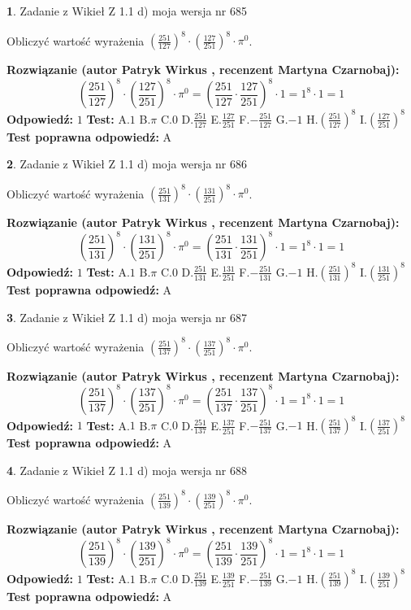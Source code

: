 \documentclass[12pt, a4paper]{article}
\theoremstyle{definition} %
\newtheorem{zad}{}
\newcommand{\zadStart}[1]{\begin{zad}#1\newline}
\newcommand{\zadStop}{\end{zad}}
\newcommand{\rozwStart}[2]{\noindent \textbf{Rozwiązanie (autor #1 , recenzent #2): }\newline}
\newcommand{\rozwStop}{\newline}
\newcommand{\odpStart}{\noindent \textbf{Odpowiedź:}\newline}
\newcommand{\odpStop}{\newline}
\newcommand{\testStart}{\noindent \textbf{Test:}\newline}
\newcommand{\testStop}{\newline}
\newcommand{\kluczStart}{\noindent \textbf{Test poprawna odpowiedź:}\newline}
\newcommand{\kluczStop}{\newline}
\begin{document}
\zadStart{Zadanie z Wikieł Z 1.1 d) moja wersja nr 685}

Obliczyć wartość wyrażenia $(\frac{251}{127})^{8} \cdot (\frac{127}{251})^{8} \cdot \pi^{0}$.
\zadStop
\rozwStart{Patryk Wirkus}{Martyna Czarnobaj}
$$(\frac{251}{127})^{8} \cdot (\frac{127}{251})^{8} \cdot \pi^{0} = (\frac{251}{127} \cdot \frac{127}{251})^{8} \cdot 1 = 1^{8} \cdot 1 = 1$$
\rozwStop
\odpStart
$1$
\odpStop
\testStart
A.$1$ B.$\pi$ C.$0$ D.$\frac{251}{127}$ E.$\frac{127}{251}$
F.$-\frac{251}{127}$ G.$-1$
H.$(\frac{251}{127})^{8}$
I.$(\frac{127}{251})^{8}$
\testStop
\kluczStart
A
\kluczStop



\zadStart{Zadanie z Wikieł Z 1.1 d) moja wersja nr 686}

Obliczyć wartość wyrażenia $(\frac{251}{131})^{8} \cdot (\frac{131}{251})^{8} \cdot \pi^{0}$.
\zadStop
\rozwStart{Patryk Wirkus}{Martyna Czarnobaj}
$$(\frac{251}{131})^{8} \cdot (\frac{131}{251})^{8} \cdot \pi^{0} = (\frac{251}{131} \cdot \frac{131}{251})^{8} \cdot 1 = 1^{8} \cdot 1 = 1$$
\rozwStop
\odpStart
$1$
\odpStop
\testStart
A.$1$ B.$\pi$ C.$0$ D.$\frac{251}{131}$ E.$\frac{131}{251}$
F.$-\frac{251}{131}$ G.$-1$
H.$(\frac{251}{131})^{8}$
I.$(\frac{131}{251})^{8}$
\testStop
\kluczStart
A
\kluczStop



\zadStart{Zadanie z Wikieł Z 1.1 d) moja wersja nr 687}

Obliczyć wartość wyrażenia $(\frac{251}{137})^{8} \cdot (\frac{137}{251})^{8} \cdot \pi^{0}$.
\zadStop
\rozwStart{Patryk Wirkus}{Martyna Czarnobaj}
$$(\frac{251}{137})^{8} \cdot (\frac{137}{251})^{8} \cdot \pi^{0} = (\frac{251}{137} \cdot \frac{137}{251})^{8} \cdot 1 = 1^{8} \cdot 1 = 1$$
\rozwStop
\odpStart
$1$
\odpStop
\testStart
A.$1$ B.$\pi$ C.$0$ D.$\frac{251}{137}$ E.$\frac{137}{251}$
F.$-\frac{251}{137}$ G.$-1$
H.$(\frac{251}{137})^{8}$
I.$(\frac{137}{251})^{8}$
\testStop
\kluczStart
A
\kluczStop



\zadStart{Zadanie z Wikieł Z 1.1 d) moja wersja nr 688}

Obliczyć wartość wyrażenia $(\frac{251}{139})^{8} \cdot (\frac{139}{251})^{8} \cdot \pi^{0}$.
\zadStop
\rozwStart{Patryk Wirkus}{Martyna Czarnobaj}
$$(\frac{251}{139})^{8} \cdot (\frac{139}{251})^{8} \cdot \pi^{0} = (\frac{251}{139} \cdot \frac{139}{251})^{8} \cdot 1 = 1^{8} \cdot 1 = 1$$
\rozwStop
\odpStart
$1$
\odpStop
\testStart
A.$1$ B.$\pi$ C.$0$ D.$\frac{251}{139}$ E.$\frac{139}{251}$
F.$-\frac{251}{139}$ G.$-1$
H.$(\frac{251}{139})^{8}$
I.$(\frac{139}{251})^{8}$
\testStop
\kluczStart
A
\kluczStop
\end{document}
